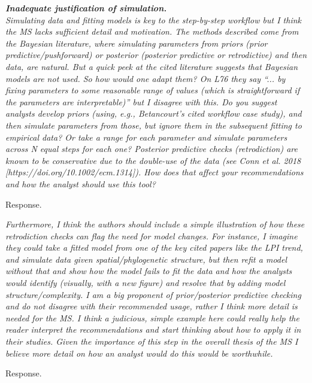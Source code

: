 \documentclass[11pt,letter]{article}
\begin{document}
\begin{mybox}
\emph{\textbf{Inadequate justification of simulation.}\\
Simulating data and fitting models is key to the step-by-step workflow but I think the MS lacks sufficient
detail and motivation. The methods described come from the Bayesian literature, where simulating
parameters from priors (prior predictive/pushforward) or posterior (posterior predictive or retrodictive)
and then data, are natural. But a quick peek at the cited literature suggests that Bayesian models are not
used. So how would one adapt them? On L76 they say “... by fixing parameters to some reasonable
range of values (which is straightforward if the parameters are interpretable)” but I disagree with this.
Do you suggest analysts develop priors (using, e.g., Betancourt’s cited workflow case study), and then
simulate parameters from those, but ignore them in the subsequent fitting to empirical data? Or take a
range for each parameter and simulate parameters across N equal steps for each one? Posterior
predictive checks (retrodiction) are known to be conservative due to the double-use of the data (see
Conn et al. 2018 [https://doi.org/10.1002/ecm.1314]). How does that affect your recommendations and
how the analyst should use this tool?}
\end{mybox}

Response.

\begin{mybox}
\emph{Furthermore, I think the authors should include a simple illustration of how these retrodiction checks can flag the need for model changes. For instance, I imagine they could take a fitted model from one of the key cited papers like the LPI trend, and simulate data given spatial/phylogenetic structure, but then refit a model without that and show how the model fails to fit the data and how the analysts would
identify (visually, with a new figure) and resolve that by adding model structure/complexity. I am a big proponent of prior/posterior predictive checking and do not disagree with their recommended usage, rather I think more detail is needed for the MS. I think a judicious, simple example here could really help the reader interpret the recommendations and start thinking about how to apply it in their studies. Given the importance of this step in the overall thesis of the MS I believe more detail on how an analyst would do this would be worthwhile.}
\end{mybox}

Response.
\end{document}
